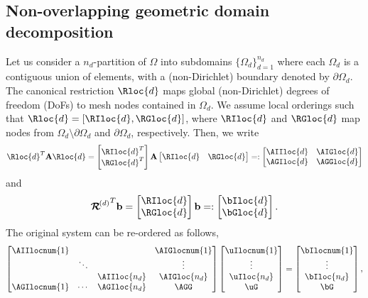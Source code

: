 \documentclass{article}
\begin{document}
\subsection{Non-overlapping geometric domain decomposition}
Let us consider a $n_d$-partition of $\Omega$ into subdomains $\{\Omega_d\}_{d=1}^{n_d}$ where each $\Omega_d$ is a contiguous union of elements, with a (non-Dirichlet) boundary denoted by $\partial\Omega_d$.
The canonical restriction $\Rloc{d}$ maps global (non-Dirichlet) degrees of freedom (DoFs) to mesh nodes contained in $\Omega_d$.
We assume local orderings such that $\Rloc{d}=[\RIloc{d},\RGloc{d}]$,
where $\RIloc{d}$ and $\RGloc{d}$ map nodes from $\Omega_d\setminus\partial\Omega_d$ and $\partial\Omega_d$, respectively.
Then, we write
\begin{align}
\Rloc{d}^T\mathbf{A}\Rloc{d}=
\begin{bmatrix}
\RIloc{d}^T\\
\RGloc{d}^T
\end{bmatrix}
\mathbf{A}
\begin{bmatrix}
\RIloc{d}&\RGloc{d}
\end{bmatrix}=:
\begin{bmatrix}
\AIIloc{d}&\AIGloc{d}\\
\AGIloc{d}&\AGGloc{d}
\end{bmatrix}
\end{align}
and
\begin{align}
{\boldsymbol{\mathcal{R}}^{\!(d)}}^T\mathbf{b}=
\begin{bmatrix}
\RIloc{d}\\
\RGloc{d}
\end{bmatrix}
\mathbf{b}=:
\begin{bmatrix}
\bIloc{d}\\
\bGloc{d}
\end{bmatrix}.
\end{align}
The original system can be re-ordered as follows,
\begin{align}
\begin{bmatrix}
\AIIlocnum{1}&      &            &\AIGlocnum{1}\\
             &\ddots&            &\vdots       \\
             &      &\AIIloc{n_d}&\AIGloc{n_d} \\
\AGIlocnum{1}&\cdots&\AGIloc{n_d}&\AGG
\end{bmatrix}
\begin{bmatrix}
\uIlocnum{1}\\
\vdots      \\
\uIloc{n_d} \\
\uG
\end{bmatrix}
=
\begin{bmatrix}
\bIlocnum{1}\\
\vdots      \\
\bIloc{n_d} \\
\bG
\end{bmatrix},
\end{align}
\end{document}
